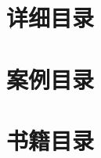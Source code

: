 \documentclass{ctexart}
\begin{document}
\clearpage\appendix

\section{详细目录}

\setcounter{tocdepth}{5}
\renewcommand*{\contentsname}{}
\begin{multicols}{2}
    \tableofcontents
\end{multicols}

\section{案例目录}

\renewcommand*{\listtheoremname}{}
\begin{multicols}{2}
    \listoftheorems[ignoreall, show = case]
\end{multicols}

\section{书籍目录}

\renewcommand*{\listtheoremname}{}
\begin{multicols}{2}
    \listoftheorems[ignoreall, show = book]
\end{multicols}
\end{document}
